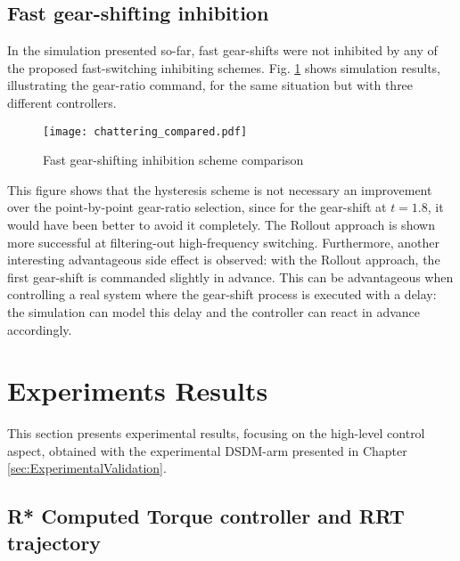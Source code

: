 \subsection{Fast gear-shifting inhibition}

In the simulation presented so-far, fast gear-shifts were not inhibited by any of the proposed fast-switching inhibiting schemes. Fig. \ref{fig:ChatteringComparaison} shows simulation results, illustrating the gear-ratio command, for the same situation but with three different controllers. 
%
\begin{figure}[htp]
	\centering
		\texttt{[image: chattering\_compared.pdf]}
	\caption{Fast gear-shifting inhibition scheme comparison}
	\label{fig:ChatteringComparaison}
\end{figure}

This figure shows that the hysteresis scheme is not necessary an improvement over the point-by-point gear-ratio selection, since for the gear-shift at $t=1.8$, it would have been better to avoid it completely. The Rollout approach is shown more successful at filtering-out high-frequency switching. Furthermore, another interesting advantageous side effect is observed: with the Rollout approach, the first gear-shift is commanded slightly in advance. This can be advantageous when controlling a real system where the gear-shift process is executed with a delay: the simulation can model this delay and the controller can react in advance accordingly.




\newpage
\section{Experiments Results}
\label{sec:shift_exp}

This section presents experimental results, focusing on the high-level control aspect, obtained with the experimental DSDM-arm presented in Chapter \ref{sec:ExperimentalValidation}.

\subsection{R* Computed Torque controller and RRT trajectory}

